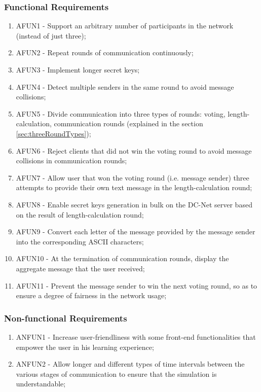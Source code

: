 \subsubsection{Functional Requirements}
\begin{enumerate}
    \item AFUN1 - Support an arbitrary number of participants in the network (instead of just three);
    \item AFUN2 - Repeat rounds of communication continuously;
    \item AFUN3 - Implement longer secret keys;
    \item AFUN4 - Detect multiple senders in the same round to avoid message collisions;
    \item AFUN5 - Divide communication into three types of rounds: voting, length-calculation, communication rounds (explained in the section \ref{sec:threeRoundTypes});
    \item AFUN6 - Reject clients that did not win the voting round to avoid message collisions in communication rounds;
    \item AFUN7 - Allow user that won the voting round (i.e. message sender) three attempts to provide their own text message in the length-calculation round;
    \item AFUN8 - Enable secret keys generation in bulk on the DC-Net server based on the result of length-calculation round;
    \item AFUN9 - Convert each letter of the message provided by the message sender into the corresponding ASCII characters;
    \item AFUN10 - At the termination of communication rounds, display the aggregate message that the user received;
    \item AFUN11 - Prevent the message sender to win the next voting round, so as to ensure a degree of fairness in the network usage;
\end{enumerate}

\subsubsection{Non-functional Requirements}
\begin{enumerate}
    \item ANFUN1 - Increase user-friendliness with some front-end functionalities that empower the user in his learning experience;
    \item ANFUN2 - Allow longer and different types of time intervals between the various stages of communication to ensure that the simulation is understandable;
\end{enumerate}

